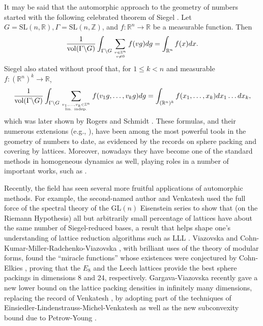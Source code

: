 \documentclass[11pt]{amsart}
\def\R{\mathbb{R}}
\numberwithin{theorem}{section}
\numberwithin{equation}{section}
\theoremstyle{remark}
\theoremstyle{definition}
\newcommand{\Z}{\mathbb{Z}}
\newcommand{\GL}{\mathrm{GL}}
\newcommand{\SL}{\mathrm{SL}}
\newcommand{\vol}{\mathrm{vol}}
\begin{document}
It may be said that the automorphic approach to the geometry of numbers started with the following celebrated theorem of Siegel \cite{Sie45}. Let $G=\SL(n,\R), \Gamma=\SL(n,\Z)$, and $f:\R^n\rightarrow\R$ be a measurable function. Then
\begin{align} \label{eq:siegel}
\frac{1}{\vol(\Gamma \backslash G)}\int_{\Gamma \backslash G} \sum_{v \in \Z^n \atop v \neq 0} f(vg) dg = \int_{\R^n}f(x)dx.
\end{align} 
Siegel \cite{Sie45} also stated without proof that, for $1 \leq k < n$ and measurable $f:(\R^n)^k\rightarrow\R$,
\begin{align*}
\frac{1}{\vol(\Gamma \backslash G)}\int_{\Gamma \backslash G} \sum_{v_1,\ldots,v_k \in \Z^n \atop \mbox{\tiny lin. indep.}} f(v_1g,\ldots,v_kg) dg = \int_{(\R^n)^k}f(x_1,\ldots,x_k)dx_1\ldots dx_k,
\end{align*}
which was later shown by Rogers \cite{Rog55} and Schmidt \cite{Sch57}. These formulas, and their numerous extensions (e.g., \cite{Vee98, AGH24, GKY22, Kim24}), have been among the most powerful tools in the geometry of numbers to date, as evidenced by the records on sphere packing \cite{Rog47,Ven13, Kla25} and covering \cite{Rog59} by lattices. Moreover, nowadays they have become one of the standard methods in homogeneous dynamics as well, playing roles in a number of important works, such as \cite{EMM98,KM99,AM09,MS10,AM15}.

Recently, the field has seen several more fruitful applications of automorphic methods. For example, the second-named author and Venkatesh \cite{KV18} used the full force of the spectral theory of the $\GL(n)$ Eisenstein series to show that (on the Riemann Hypothesis) all but arbitrarily small percentage of lattices have about the same number of Siegel-reduced bases, a result that helps shape one's understanding of lattice reduction algorithms such as LLL \cite{LLL82}. Viazovska \cite{Via17} and Cohn-Kumar-Miller-Radchenko-Viazovska \cite{CKMRV}, with brilliant uses of the theory of modular forms, found the ``miracle functions'' whose existences were conjectured by Cohn-Elkies \cite{CE03}, proving that the $E_8$ and the Leech lattices provide the best sphere packings in dimensions 8 and 24, respectively. Gargava-Viazovska \cite{GV24} recently gave a new lower bound on the lattice packing densities in infinitely many dimensions, replacing the record of Venkatesh \cite{Ven13}, by adopting part of the techniques of Einsiedler-Lindenstrauss-Michel-Venkatesh \cite{ELMV} as well as the new subconvexity bound due to Petrow-Young \cite{PY23}.
\end{document}
